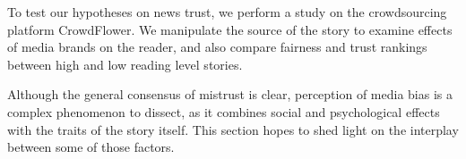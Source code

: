 To test our hypotheses on news trust, we perform a study on the crowdsourcing platform CrowdFlower. We manipulate the source of the story to examine effects of media brands on the reader, and also compare fairness and trust rankings between high and low reading level stories.



Although the general consensus of mistrust is clear, perception of media bias is a complex phenomenon to dissect, as it combines social and psychological effects with the traits of the story itself. This section hopes to shed light on the interplay between some of those factors.

%  